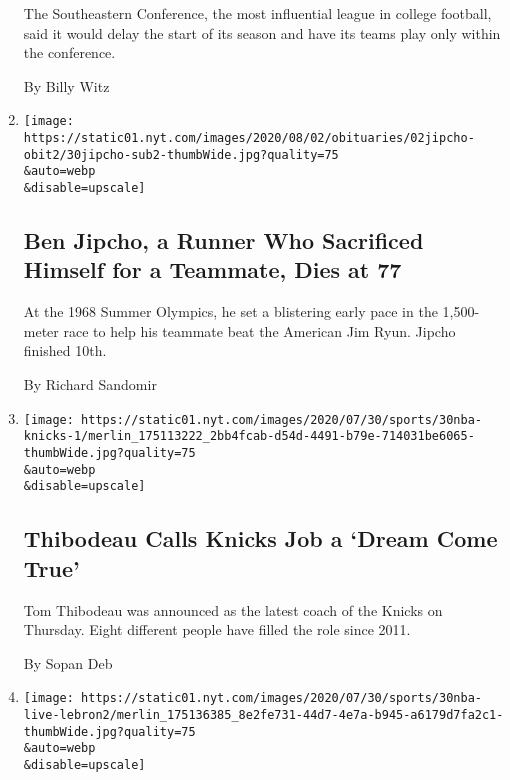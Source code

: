 \begin{enumerate}
  The Southeastern Conference, the most influential league in college
  football, said it would delay the start of its season and have its
  teams play only within the conference.

  By Billy Witz
\item
  \href{/2020/07/30/sports/olympics/ben-jipcho-dead.html}{}

  \texttt{[image: https://static01.nyt.com/images/2020/08/02/obituaries/02jipcho-obit2/30jipcho-sub2-thumbWide.jpg?quality=75\\\&auto=webp\\\&disable=upscale]}

  \hypertarget{ben-jipcho-a-runner-who-sacrificed-himself-for-a-teammate-dies-at-77}{%
  \subsection{Ben Jipcho, a Runner Who Sacrificed Himself for a
  Teammate, Dies at
  77}\label{ben-jipcho-a-runner-who-sacrificed-himself-for-a-teammate-dies-at-77}}

  At the 1968 Summer Olympics, he set a blistering early pace in the
  1,500-meter race to help his teammate beat the American Jim Ryun.
  Jipcho finished 10th.

  By Richard Sandomir
\item
  \href{/2020/07/30/sports/basketball/nba-knicks-coach-tom-thibodeau.html}{}

  \texttt{[image: https://static01.nyt.com/images/2020/07/30/sports/30nba-knicks-1/merlin\_175113222\_2bb4fcab-d54d-4491-b79e-714031be6065-thumbWide.jpg?quality=75\\\&auto=webp\\\&disable=upscale]}

  \hypertarget{thibodeau-calls-knicks-job-a-dream-come-true}{%
  \subsection{Thibodeau Calls Knicks Job a `Dream Come
  True'}\label{thibodeau-calls-knicks-job-a-dream-come-true}}

  Tom Thibodeau was announced as the latest coach of the Knicks on
  Thursday. Eight different people have filled the role since 2011.

  By Sopan Deb
\item
  \href{/2020/07/30/sports/basketball/clippers-lakers.html}{}

  \texttt{[image: https://static01.nyt.com/images/2020/07/30/sports/30nba-live-lebron2/merlin\_175136385\_8e2fe731-44d7-4e7a-b945-a6179d7fa2c1-thumbWide.jpg?quality=75\\\&auto=webp\\\&disable=upscale]}


\end{enumerate}
